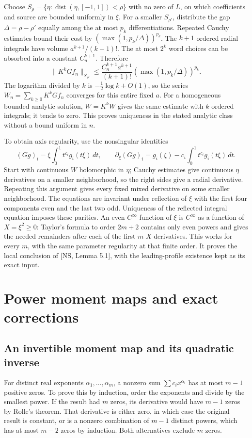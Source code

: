 \documentclass[10pt,a4paper]{article}
\newcommand{\dist}{\operatorname{dist}}
\begin{document}
Choose $S_\rho=\{\eta:\dist(\eta,[-1,1])<\rho\}$ with no zero of $L$,
on which coefficients and source are bounded uniformly in $\xi$. For a smaller
$S_{\rho'}$, distribute the gap $\Delta=\rho-\rho'$ equally among the at most
$p_k$ differentiations. Repeated Cauchy estimates bound their cost by
$(\max(1,p_k/\Delta))^{p_k}$. The $k+1$ ordered radial integrals have volume
$a^{k+1}/(k+1)!$. The at most $2^k$ word choices can be absorbed into a constant
$C_n^{k+1}$. Therefore
\[
 \|K^kGf_n\|_{S_{\rho'}}
 \le \frac{C_n^{k+1}a^{k+1}}{(k+1)!}
       (\max(1,p_k/\Delta))^{p_k}.
\]
The logarithm divided by $k$ is $-\tfrac12\log k+O(1)$, so the series
$W_n=\sum_{k\ge0}K^kGf_n$ converges for this entire fixed $a$.
For a homogeneous bounded analytic solution, $W=K^kW$ gives the same estimate
with $k$ ordered integrals; it tends to zero. This proves uniqueness in the
stated analytic class without a bound uniform in $n$.

To obtain axis regularity, use the nonsingular identities
\[
(Gg)_i=\xi\int_0^1t^{c_i}g_i(t\xi)\,dt,
\qquad \partial_\xi(Gg)_i=g_i(\xi)-c_i\int_0^1t^{c_i}g_i(t\xi)\,dt.
\]
Start with continuous $W$ holomorphic in $\eta$; Cauchy estimates give continuous
$\eta$ derivatives on a smaller neighborhood, so the right sides give a radial
derivative. Repeating this argument gives every fixed mixed derivative on some
smaller neighborhood. The equations are invariant under reflection of $\xi$
with the first four components even and the last two odd. Uniqueness of the
reflected integral equation imposes these parities. An even $C^\infty$ function
of $\xi$ is $C^\infty$ as a function of $X=\xi^2\ge0$: Taylor's formula to
order $2m+2$ contains only even powers and gives the needed remainders after
each of the first $m$ $X$ derivatives. This works for every $m$, with the same
parameter regularity at that finite order. It proves the local conclusion of
[NS, Lemma 5.1], with the leading-profile existence kept as its exact input.

\section{Power moment maps and exact corrections}
\subsection{An invertible moment map and its quadratic inverse}
For distinct real exponents $\alpha_1,\ldots,\alpha_m$, a nonzero sum
$\sum c_ix^{\alpha_i}$ has at most $m-1$ positive zeros. To prove this by
induction, order the exponents and divide by the smallest power. If the result
had $m$ zeros, its derivative would have $m-1$ zeros by Rolle's theorem. That
derivative is either zero, in which case the original result is constant, or
is a nonzero combination of $m-1$ distinct powers, which has at most $m-2$
zeros by induction. Both alternatives exclude $m$ zeros.
\end{document}
